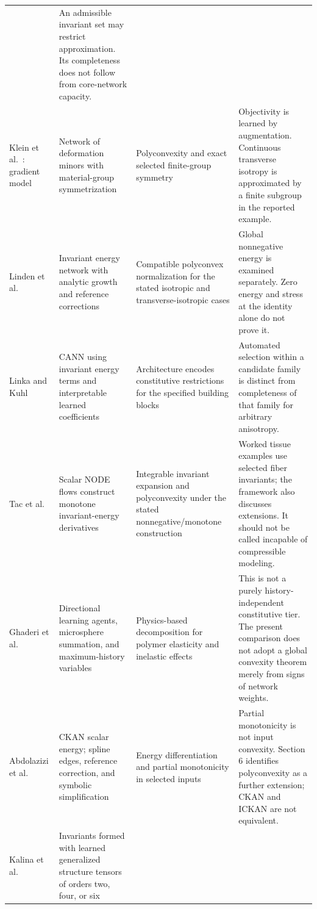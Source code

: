 \begin{longtable}{@{}>{\raggedright\arraybackslash}p{2.6cm}>{\raggedright\arraybackslash}p{4.05cm}>{\raggedright\arraybackslash}p{4.15cm}>{\raggedright\arraybackslash}p{4.85cm}@{}}
& An admissible invariant set may restrict approximation. Its completeness does not follow from core-network capacity.\\
\addlinespace
Klein et al.~\cite{klein2022}: gradient model
& Network of deformation minors with material-group symmetrization
& Polyconvexity and exact selected finite-group symmetry
& Objectivity is learned by augmentation. Continuous transverse isotropy is approximated by a finite subgroup in the reported example.\\
\addlinespace
Linden et al.~\cite{linden2023}
& Invariant energy network with analytic growth and reference corrections
& Compatible polyconvex normalization for the stated isotropic and transverse-isotropic cases
& Global nonnegative energy is examined separately. Zero energy and stress at the identity alone do not prove it.\\
\addlinespace
Linka and Kuhl~\cite{Linka2023}
& CANN using invariant energy terms and interpretable learned coefficients
& Architecture encodes constitutive restrictions for the specified building blocks
& Automated selection within a candidate family is distinct from completeness of that family for arbitrary anisotropy.\\
\addlinespace
Tac et al.~\cite{Tac2022}
& Scalar NODE flows construct monotone invariant-energy derivatives
& Integrable invariant expansion and polyconvexity under the stated nonnegative/monotone construction
& Worked tissue examples use selected fiber invariants; the framework also discusses extensions. It should not be called incapable of compressible modeling.\\
\addlinespace
Ghaderi et al.~\cite{Ghaderi2020}
& Directional learning agents, microsphere summation, and maximum-history variables
& Physics-based decomposition for polymer elasticity and inelastic effects
& This is not a purely history-independent constitutive tier. The present comparison does not adopt a global convexity theorem merely from signs of network weights.\\
\addlinespace
Abdolazizi et al.~\cite{Abdolazizi2025}
& CKAN scalar energy; spline edges, reference correction, and symbolic simplification
& Energy differentiation and partial monotonicity in selected inputs
& Partial monotonicity is not input convexity. Section 6 identifies polyconvexity as a further extension; CKAN and ICKAN are not equivalent.\\
\addlinespace
Kalina et al.~\cite{Kalina2024}
& Invariants formed with learned generalized structure tensors of orders two, four, or six

\end{longtable}
